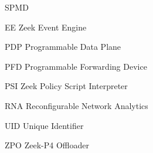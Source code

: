 
\begin{listofabbrv}{SPMD}
    \item[EE]  Zeek Event Engine
    \item[PDP] Programmable Data Plane
    \item[PFD] Programmable Forwarding Device
    \item[PSI] Zeek Policy Script Interpreter
    \item[RNA] Reconfigurable Network Analytics
    \item[UID] Unique Identifier
    \item[ZPO] Zeek-P4 Offloader
\end{listofabbrv}

